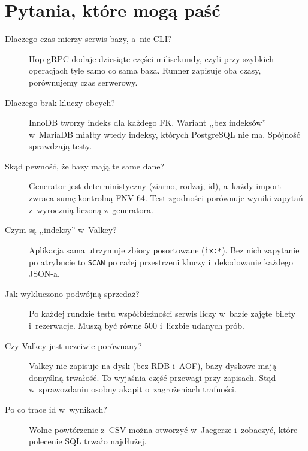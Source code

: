 \documentclass[10pt,a4paper]{article}
\begin{document}
\section*{Pytania, które mogą paść}
\begin{description}
  \item[Dlaczego czas mierzy serwis bazy, a~nie CLI?] Hop gRPC dodaje
  dziesiąte części milisekundy, czyli przy szybkich operacjach tyle samo co
  sama baza. Runner zapisuje oba czasy, porównujemy czas serwerowy.
  \item[Dlaczego brak kluczy obcych?] InnoDB tworzy indeks dla każdego FK.
  Wariant ,,bez indeksów'' w~MariaDB miałby wtedy indeksy, których
  PostgreSQL nie ma. Spójność sprawdzają testy.
  \item[Skąd pewność, że bazy mają te same dane?] Generator jest
  deterministyczny (ziarno, rodzaj, id), a~każdy import zwraca sumę
  kontrolną FNV-64. Test zgodności porównuje wyniki zapytań z~wyrocznią
  liczoną z~generatora.
  \item[Czym są ,,indeksy'' w~Valkey?] Aplikacja sama utrzymuje zbiory
  posortowane (\texttt{ix:*}). Bez nich zapytanie po atrybucie to
  \texttt{SCAN} po całej przestrzeni kluczy i~dekodowanie każdego JSON-a.
  \item[Jak wykluczono podwójną sprzedaż?] Po każdej rundzie testu
  współbieżności serwis liczy w~bazie zajęte bilety i~rezerwacje. Muszą być
  równe 500 i~liczbie udanych prób.
  \item[Czy Valkey jest uczciwie porównany?] Valkey nie zapisuje na dysk
  (bez RDB i~AOF), bazy dyskowe mają domyślną trwałość. To wyjaśnia część
  przewagi przy zapisach. Stąd w~sprawozdaniu osobny akapit o~zagrożeniach
  trafności.
  \item[Po co trace id w~wynikach?] Wolne powtórzenie z~CSV można otworzyć
  w~Jaegerze i~zobaczyć, które polecenie SQL trwało najdłużej.
\end{description}
\end{document}
